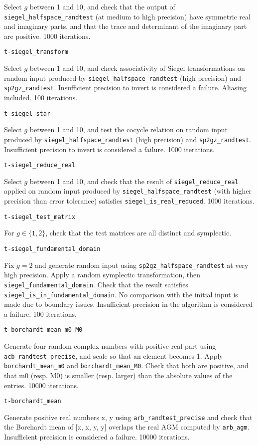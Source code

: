 \documentclass{article}
\newcommand{\code}[1]{\lstinline:#1:}
\newcommand{\fun}[1]{\vspace{2mm}\noindent \code{#1}}
\begin{document}
Select $g$ between 1 and 10, and check that the output of
\code{siegel_halfspace_randtest} (at medium to high precision) have
symmetric real and imaginary parts, and that the trace and determinant
of the imaginary part are positive. 1000 iterations.

\fun{t-siegel_transform}

Select $g$ between 1 and 10, and check associativity of Siegel
transformations on random input produced by
\code{siegel_halfspace_randtest} (high precision) and
\code{sp2gz_randtest}. Insufficient precision to invert is considered
a failure. Aliasing included. 100 iterations.

\fun{t-siegel_star}

Select $g$ between 1 and 10, and test the cocycle relation on random
input produced by \code{siegel_halfspace_randtest} (high precision)
and \code{sp2gz_randtest}. Insufficient precision to invert is
considered a failure. 1000 iterations.

\fun{t-siegel_reduce_real}

Select $g$ between 1 and 10, and check that the result of
\code{siegel_reduce_real} applied on random input produced by
\code{siegel_halfspace_randtest} (with higher precision than error
tolerance) satisfies \code{siegel_is_real_reduced}. 1000 iterations.

\fun{t-siegel_test_matrix}

For $g\in\{1,2\}$, check that the test matrices are all distinct and
symplectic.

\fun{t-siegel_fundamental_domain}

Fix $g=2$ and generate random input using
\code{sp2gz_halfspace_randtest} at very high precision. Apply a random
symplectic transformation, then
\code{siegel_fundamental_domain}. Check that the result satisfies
\code{siegel_is_in_fundamental_domain}. No comparison with the initial
input is made due to boundary issues. Insufficient precision in the
algorithm is considered a failure. 100 iterations.

\fun{t-borchardt_mean_m0_M0}

Generate four random complex numbers with positive real part using
\code{acb_randtest_precise}, and scale so that an element becomes
1. Apply \code{borchardt_mean_m0} and \code{borchardt_mean_M0}. Check
that both are positive, and that m0 (resp. M0) is smaller
(resp. larger) than the absolute values of the entries. 10000
iterations.

\fun{t-borchardt_mean}

Generate positive real numbers x, y using \code{arb_randtest_precise}
and check that the Borchardt mean of [x, x, y, y] overlaps the real
AGM computed by \code{arb_agm}. Insufficient precision is considered a
failure. 10000 iterations.
\end{document}
